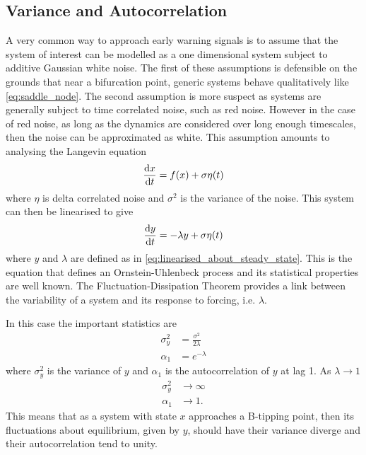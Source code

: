 \subsection{Variance and Autocorrelation}
A very common way to approach early warning signals is to assume that the system of interest can be modelled as a one dimensional system subject to additive Gaussian white noise. The first
of these assumptions is defensible on the grounds that near a bifurcation point, generic systems behave qualitatively like \cref{eq:saddle_node}. The second assumption is more suspect
as systems are generally subject to time correlated noise, such as red noise. However in the case of red noise, as long as the dynamics are considered over long enough timescales, then the
noise can be approximated as white. This assumption amounts to analysing the Langevin equation \parencite{Langevin1908}
\begin{equation}
  \label{eq:stochastic_system}
  \dv{x}{t} = f(x) + \sigma \eta(t) 
\end{equation}
where $\eta$ is delta correlated noise and $\sigma^2$ is the variance of the noise. This system can then be linearised to give
\begin{equation}
  \label{eq:ou_process}
  \dv{y}{t} = -\lambda y + \sigma \eta(t)
\end{equation}
where $y$ and $\lambda$ are defined as in \cref{eq:linearised_about_steady_state}. This is the equation that defines an Ornstein-Uhlenbeck process \parencite{Uhlenbeck1930} and its statistical
properties are well known. The Fluctuation-Dissipation Theorem \parencite{Marconi2008,Kubo1966,Leith1975,Einstein1905}
provides a link between the variability of a system and its response to
forcing, i.e. $\lambda$.

In this case the important statistics are
\begin{align}
  \sigma^2_y &= \frac{\sigma^2}{2\lambda} \label{eq:y_var}\\
  \alpha_1   &= e^{-\lambda} \label{eq:y_ac}
\end{align}
where $\sigma^2_y$ is the variance of $y$ and $\alpha_1$ is the autocorrelation of $y$ at lag 1. As $\lambda \rightarrow 1$
\begin{align}
  \sigma_y^2 &\rightarrow \infty \\
  \alpha_1    &\rightarrow 1.
\end{align}
This means that as a system with state $x$ approaches a B-tipping point, then its fluctuations about equilibrium, given by $y$, should have their variance diverge and their autocorrelation
tend to unity.

